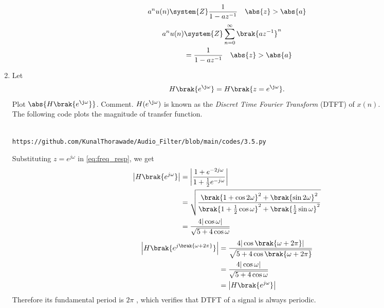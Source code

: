 \documentclass[journal,12pt,twocolumn]{IEEEtran}
\theoremstyle{remark}
\begin{document}
\begin{enumerate}[label=\thesection.\arabic*]
\begin{equation}
								\label{eq:anun}
								a^nu(n) \system{Z} \frac{1}{1-az^{-1}} \quad \abs{z} > \abs{a}
								\end{equation}
								\solution 
								\begin{align}
									a^nu(n) &\system{Z} \sum_{n = 0}^{\infty}\brak{az^{-1}}^n \\
												&= \frac{1}{1-az^{-1}} \quad \abs{z} > \abs{a}
												\end{align}
												\item 
												Let
												\begin{equation}
												H\brak{e^{\j \omega}} = H\brak{z = e^{\j \omega}}.
												\end{equation}
												Plot $\abs{H\brak{e^{\j \omega}}}$.  Comment.  $H(e^{\j \omega})$ is
												known as the {\em Discret Time Fourier Transform} (DTFT) of $x(n)$.
												\\
												\solution The following code plots the magnitude of transfer function.
												\begin{lstlisting}
												https://github.com/KunalThorawade/Audio_Filter/blob/main/codes/3.5.py
												\end{lstlisting}
												Substituting $z = e^{j \omega}$ in \eqref{eq:freq_resp}, we get
												\begin{align}
													\left|H\brak{e^{j\omega}}\right| &= \left|\frac{1 + e^{-2j\omega}}{1 + \frac{1}{2}e^{-j\omega}}\right| \\
																						  &= \sqrt{\frac{\brak{1 + \cos{2\omega}}^2 + \brak{\sin{2\omega}}^2}{\brak{1 + \frac{1}{2}\cos{\omega}}^2 + \brak{\frac{1}{2}\sin{\omega}}^2}}\\
																						  									  &= \frac{4|\cos{\omega}|}{\sqrt{5 + 4\cos{\omega}}}
																															  \end{align}
																															  \begin{align}
																															  	\left|H\brak{e^{j\brak{\omega + 2\pi}}}\right| &= \frac{4|\cos\brak{\omega + 2\pi}|}{\sqrt{5 + 4\cos\brak{\omega + 2\pi}}} \\
																																											   &= \frac{4|\cos{\omega}|}{\sqrt{5 + 4\cos{\omega}}} \\
																																											   											   &= \left|H\brak{e^{j\omega}}\right|	
																																																						   \end{align}
																																																						   Therefore its fundamental period is $2\pi$ , which verifies that DTFT of a signal is always periodic.


\end{enumerate}
\end{document}
